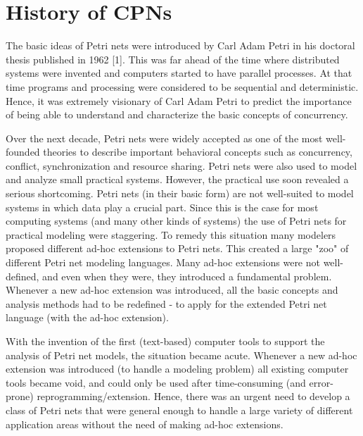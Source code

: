 \section{History of CPNs}

The basic ideas of Petri nets were introduced by Carl Adam Petri in
his doctoral thesis published in 1962 [1]. This was far ahead of the
time where distributed systems were invented and computers started to
have parallel processes. At that time programs and processing were
considered to be sequential and deterministic. Hence, it was extremely
visionary of Carl Adam Petri to predict the importance of being able
to understand and characterize the basic concepts of concurrency.

Over the next decade, Petri nets were widely accepted as one of the
most well-founded theories to describe important behavioral concepts
such as concurrency, conflict, synchronization and resource
sharing. Petri nets were also used to model and analyze small
practical systems. However, the practical use soon revealed a serious
shortcoming. Petri nets (in their basic form) are not well-suited to
model systems in which data play a crucial part. Since this is the
case for most computing systems (and many other kinds of systems) the
use of Petri nets for practical modeling were staggering. To remedy
this situation many modelers proposed different ad-hoc extensions to
Petri nets. This created a large "zoo" of different Petri net modeling
languages. Many ad-hoc extensions were not well-defined, and even when
they were, they introduced a fundamental problem. Whenever a new
ad-hoc extension was introduced, all the basic concepts and analysis
methods had to be redefined - to apply for the extended Petri net
language (with the ad-hoc extension).

With the invention of the first (text-based) computer tools to support
the analysis of Petri net models, the situation became acute. Whenever
a new ad-hoc extension was introduced (to handle a modeling problem)
all existing computer tools became void, and could only be used after
time-consuming (and error-prone) reprogramming/extension. Hence, there
was an urgent need to develop a class of Petri nets that were general
enough to handle a large variety of different application areas
without the need of making ad-hoc extensions.

